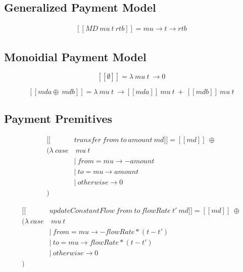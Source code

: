 \documentclass[a4paper]{report}
\begin{document}
\subsection{Generalized Payment Model}

\begin{equation}\label{sem_transfer}
    \begin{split}
        [\![MD\ mu\ t\ rtb]\!] = mu \rightarrow t \rightarrow rtb
    \end{split}
\end{equation}

\subsection{Monoidial Payment Model}

\begin{equation}\label{sem_mzero}
    [\![\emptyset]\!] = \lambda\ mu\ t\ \rightarrow 0
\end{equation}

\begin{equation}\label{sem_mappend}
    [\![mda \oplus\ mdb]\!] = \lambda\ mu\ t\ \rightarrow
    [\![mda]\!]\ mu\ t\ +\ [\![mdb]\!]\ mu\ t
\end{equation}

\subsection{Payment Premitives}

\begin{equation}\label{sem_transfer}
    \begin{split}
        [\![&transfer\ from\ to\ amount\ md]\!] = [\![md]\!]\ \oplus \\
        (\lambda\ case&\ mu\ t \\
        &|\ from = mu \rightarrow -amount \\
        &|\ to   = mu \rightarrow amount \\
        &|\ otherwise \rightarrow 0 \\
        )
    \end{split}
\end{equation}

\begin{equation}\label{sem_updateConstantFlow}
    \begin{split}
        [\![&updateConstantFlow\ from\ to\ flowRate\ t'\ md]\!] = [\![md]\!]\ \oplus \\
        (\lambda\ case&\ mu\ t \\
        &|\ from = mu \rightarrow -flowRate * (t - t') \\
        &|\ to   = mu \rightarrow flowRate  * (t - t') \\
        &|\ otherwise \rightarrow 0 \\
        )
    \end{split}
\end{equation}
\end{document}
